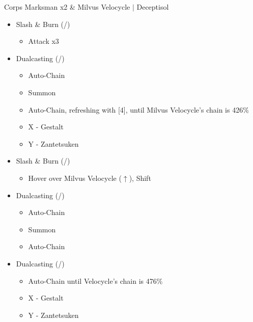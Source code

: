 \renewcommand{\first}{[1] Slash \& Burn (\com/\rav)}
\renewcommand{\second}{[2] War \& Peace (\com/\med)}
\renewcommand{\third}{[3] Supersoldier (\com/\syn)}
\renewcommand{\fourth}{[4] Dualcasting (\rav/\rav)}
\renewcommand{\fifth}{[5] Dualcasting (\rav/\rav)}
\renewcommand{\sixth}{[6] Slash \& Burn (\com/\rav)}
\begin{battle}[0:33]{Corps Marksman x2 \& Milvus Velocycle $|$ Deceptisol}
	\begin{multicols}{2}
		\begin{itemize}
			\item \first
			      \begin{itemize}
				      \item Attack x3
			      \end{itemize}
			\item \fifth
			      \begin{itemize}
				      \item Auto-Chain
				      \item Summon
				      \item Auto-Chain, refreshing with [4], until Milvus Velocycle's chain is 426\%
				      \item X - Gestalt
				      \item Y - Zantetsuken
			      \end{itemize}
			      \columnbreak
			\item \first
			      \begin{itemize}
				      \item Hover over Milvus Velocycle ($\uparrow$), Shift
			      \end{itemize}
			\item \fifth
			      \begin{itemize}
				      \item Auto-Chain
				      \item Summon
				      \item Auto-Chain
			      \end{itemize}
			\item \fourth
			      \begin{itemize}
				      \item Auto-Chain until Velocycle's chain is 476\%
				      \item X - Gestalt
				      \item Y - Zantetsuken
			      \end{itemize}
		\end{itemize}
	\end{multicols}
\end{battle}
